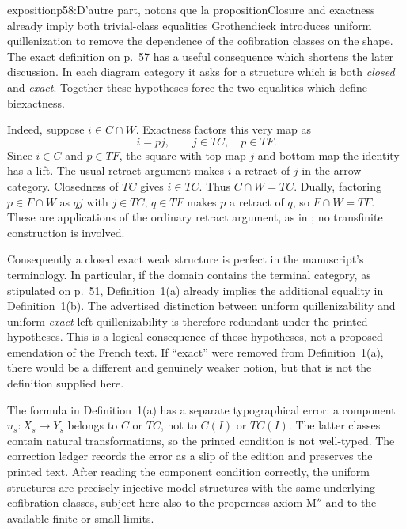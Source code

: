 \begin{dcomment}{exposition}{p58:D'autre part, notons que la proposition}{Closure and exactness already imply both trivial-class equalities}
Grothendieck introduces uniform quillenization to remove the dependence of the cofibration classes on the shape. The exact definition on p.~57 has a useful consequence which shortens the later discussion. In each diagram category it asks for a structure which is both \emph{closed} and \emph{exact}. Together these hypotheses force the two equalities which define biexactness.

Indeed, suppose $i\in C\cap W$. Exactness factors this very map as
\[
 i=pj,\qquad j\in TC,\quad p\in TF.
\]
Since $i\in C$ and $p\in TF$, the square with top map $j$ and bottom map the identity has a lift. The usual retract argument makes $i$ a retract of $j$ in the arrow category. Closedness of $TC$ gives $i\in TC$. Thus $C\cap W=TC$. Dually, factoring $p\in F\cap W$ as $qj$ with $j\in TC$, $q\in TF$ makes $p$ a retract of $q$, so $F\cap W=TF$. These are applications of the ordinary retract argument, as in \citet[Lemma~1.1.9]{Hovey1999}; no transfinite construction is involved.

Consequently a closed exact weak structure is perfect in the manuscript's terminology. In particular, if the domain contains the terminal category, as stipulated on p.~51, Definition~1(a) already implies the additional equality in Definition~1(b). The advertised distinction between uniform quillenizability and uniform \emph{exact} left quillenizability is therefore redundant under the printed hypotheses. This is a logical consequence of those hypotheses, not a proposed emendation of the French text. If ``exact'' were removed from Definition~1(a), there would be a different and genuinely weaker notion, but that is not the definition supplied here.

The formula in Definition~1(a) has a separate typographical error: a component $u_s:X_s\to Y_s$ belongs to $C$ or $TC$, not to $C(I)$ or $TC(I)$. The latter classes contain natural transformations, so the printed condition is not well-typed. The correction ledger records the error as a slip of the edition and preserves the printed text. After reading the component condition correctly, the uniform structures are precisely injective model structures with the same underlying cofibration classes, subject here also to the properness axiom M$''$ and to the available finite or small limits.
\end{dcomment}


